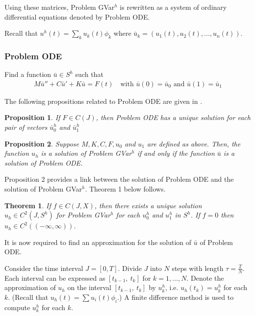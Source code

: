 \documentclass[../../main.tex]{subfiles}
\begin{document}
Using these matrices, Problem GVar$^h$ is rewritten as a system of ordinary
differential equations denoted by Problem ODE. 

Recall that $u^h(t) = \sum_{k} u_k(t)\phi_k$ where $\bar{u}_k = \left( u_1(t), u_2(t), ...  , u_n(t)\right)$.

\subsubsection*{Problem ODE}
Find a function $\bar{u} \in S^h$ such that \label{sym:baru}
\begin{eqnarray}
	M\bar{u}'' + C \bar{u}' + K\bar{u} = F(t) \ \ \ \textrm{ with } \bar{u}(0) = \bar{u}_0 \textrm{ and }  \bar{u}(1) = \bar{u}_1 \label{ODE}
\end{eqnarray}


The following propositions related to Problem ODE are given in \cite{BV13}.

\newtheorem{DC_Prop2}{Proposition}
\begin{DC_Prop2}
	If $F\in C(J)$, then Problem ODE has a unique solution for each pair of vectors $\bar{u}^h_0$ and $\bar{u}^h_1$
\end{DC_Prop2}

\newtheorem{DC_Prop3}[DC_Prop2]{Proposition}
\begin{DC_Prop3}
	Suppose $M, K, C, F,{u}_0$ and ${u}_1$ are defined as above. Then, the function $u_{h}$ is a solution of Problem GVar$^{h}$ if and only if the function $\bar{u}$ is a solution of Problem ODE.
\end{DC_Prop3}

Proposition 2 provides a link between the solution of Problem ODE and the
solution of Problem GVar$^h$. Theorem 1 below follows.

\newtheorem{DC_Thm2}{Theorem}
\begin{DC_Thm2} \label{DC_THM2}
	If $f \in C(J,X)$, then there exists a unique solution $u_h \in C^2(J, S^h)$ for Problem GVar$^h$ for each $u_0^h$ and $u_1^h$ in $S^h$. If $f = 0$ then $u_h \in C^2((-\infty, \infty))$.
\end{DC_Thm2}

It is now required to find an approximation for the solution of $\bar{u}$ of Problem ODE.

Consider the time interval $J = [0,T]$. Divide $J$ into $N$ steps with length $\tau = \frac{T}{N}$. Each interval can be expressed as $[t_{k-1}, \ t_k]$ for $k = 1,...,N$. Denote the approximation of $u_h$ on the interval $[t_{k-1}, \ t_k]$ by $u_k^h$, i.e. $u_h(t_k) = u_k^h$ for each $k$. (Recall that $u_h(t) = \sum u_i(t)\phi_i$.) A finite difference method is used to compute $u^h_k$ for each $k$.
\end{document}

